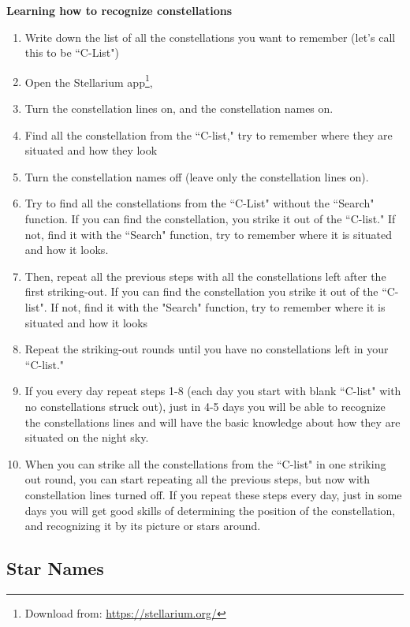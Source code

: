 \documentclass[a4paper,12pt]{extarticle}
\begin{document}
\textbf{Learning how to recognize constellations}

\begin{enumerate}[1.]
	\itemsep0em 
	\item Write down the list of all the constellations you want to remember (let's call this to be ``C-List")
	\item Open the Stellarium app\footnote{Download from: \url{https://stellarium.org/}},
	\item Turn the constellation lines on, and the constellation names on.
	\item Find all the constellation from the ``C-list," try to remember where they are situated and how they look
	\item Turn the constellation names off (leave only the constellation lines on).
	\item Try to find all the constellations from the ``C-List" without the ``Search" function. If you can find the constellation, you strike it out of the ``C-list." If not, find it with the ``Search" function, try to remember where it is situated and how it looks.
	\item Then, repeat all the previous steps with all the constellations left after the first striking-out. If you can find the constellation you strike it out of the ``C-list". If not, find it with the "Search" function, try to remember where it is situated and how it looks
	\item Repeat the striking-out rounds until you have no constellations left in your ``C-list."
	\item If you every day repeat steps 1-8 (each day you start with blank ``C-list" with no constellations struck out), just in 4-5 days you will be able to recognize the constellations lines and will have the basic knowledge about how they are situated on the night sky.
	\item When you can strike all the constellations from the ``C-list" in one striking out round, you can start repeating all the previous steps, but now with constellation lines turned off. If you repeat these steps every day, just in some days you will get good skills of determining the position of the constellation, and recognizing it by its picture or stars around.
	
\end{enumerate}

\subsection{Star Names}
\end{document}
